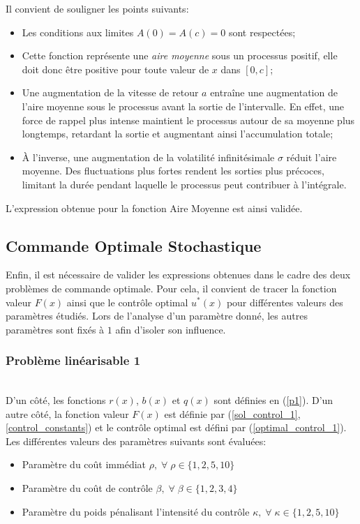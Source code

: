 Il convient de souligner les points suivants:
\begin{itemize}
    \item Les conditions aux limites $A(0)=A(c)=0$ sont respectées;
    \item Cette fonction représente une \textit{aire moyenne} sous un processus positif, elle doit donc être positive pour toute valeur de $x$ dans $[0,c]$;
    \item Une augmentation de la vitesse de retour $a$ entraîne une augmentation de l'aire moyenne sous le processus avant la sortie de l'intervalle. En effet, une force de rappel plus intense maintient le processus autour de sa moyenne plus longtemps, retardant la sortie et augmentant ainsi l'accumulation totale;
    \item À l'inverse, une augmentation de la volatilité infinitésimale $\sigma$ réduit l'aire moyenne. Des fluctuations plus fortes rendent les sorties plus précoces, limitant la durée pendant laquelle le processus peut contribuer à l'intégrale.
\end{itemize}

L'expression obtenue pour la fonction Aire Moyenne est ainsi validée.

\subsection{Commande Optimale Stochastique}

Enfin, il est nécessaire de valider les expressions obtenues dans le cadre des deux problèmes de commande optimale. Pour cela, il convient de tracer la fonction valeur $F(x)$ ainsi que le contrôle optimal $u^*(x)$ pour différentes valeurs des paramètres étudiés. Lors de l'analyse d'un paramètre donné, les autres paramètres sont fixés à $1$ afin d'isoler son influence.

\subsubsection{Problème linéarisable 1}\phantom{}\\
D'un côté, les fonctions $r(x)$, $b(x)$ et $q(x)$ sont définies en (\ref{p1}). D'un autre côté, la fonction valeur $F(x)$ est définie par (\ref{sol_control_1},\ref{control_constants}) et le contrôle optimal est défini par (\ref{optimal_control_1}). Les différentes valeurs des paramètres suivants sont évaluées:
\begin{itemize}
    \item Paramètre du coût immédiat $\rho,\;\forall\;\rho\in\{1,2,5,10\}$
    \item Paramètre du coût de contrôle $\beta,\;\forall\;\beta\in\{1,2,3,4\}$
    \item Paramètre du poids pénalisant l'intensité du contrôle $\kappa,\;\forall\;\kappa\in\{1,2,5,10\}$
\end{itemize}

